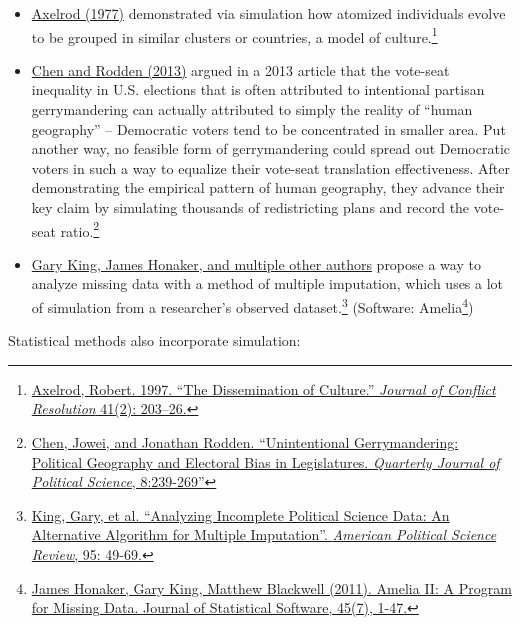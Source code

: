 \documentclass[]{book}
\providecommand{\tightlist}{%
  \setlength{\itemsep}{0pt}\setlength{\parskip}{0pt}}
\let\rmarkdownfootnote\footnote%
\def\footnote{\protect\rmarkdownfootnote}
\theoremstyle{definition}
\theoremstyle{definition}
\theoremstyle{definition}
\theoremstyle{remark}
\begin{document}
\begin{itemize}
\tightlist
\item
  \href{http://www-personal.umich.edu/~axe/research/Dissemination.pdf}{Axelrod
  (1977)} demonstrated via simulation how atomized individuals evolve to
  be grouped in similar clusters or countries, a model of
  culture.\footnote{\href{http://www-personal.umich.edu/~axe/research/Dissemination.pdf}{Axelrod,
    Robert. 1997. ``The Dissemination of Culture.'' \emph{Journal of
    Conflict Resolution} 41(2): 203--26.}}
\item
  \href{http://www-personal.umich.edu/~jowei/florida.pdf}{Chen and
  Rodden (2013)} argued in a 2013 article that the vote-seat inequality
  in U.S. elections that is often attributed to intentional partisan
  gerrymandering can actually attributed to simply the reality of
  ``human geography'' -- Democratic voters tend to be concentrated in
  smaller area. Put another way, no feasible form of gerrymandering
  could spread out Democratic voters in such a way to equalize their
  vote-seat translation effectiveness. After demonstrating the empirical
  pattern of human geography, they advance their key claim by simulating
  thousands of redistricting plans and record the vote-seat
  ratio.\footnote{\href{http://www-personal.umich.edu/~jowei/florida.pdf}{Chen,
    Jowei, and Jonathan Rodden. ``Unintentional Gerrymandering:
    Political Geography and Electoral Bias in Legislatures.
    \emph{Quarterly Journal of Political Science}, 8:239-269''}}
\item
  \href{https://gking.harvard.edu/files/abs/evil-abs.shtml}{Gary King,
  James Honaker, and multiple other authors} propose a way to analyze
  missing data with a method of multiple imputation, which uses a lot of
  simulation from a researcher's observed dataset.\footnote{\href{https://gking.harvard.edu/files/abs/evil-abs.shtml}{King,
    Gary, et al. ``Analyzing Incomplete Political Science Data: An
    Alternative Algorithm for Multiple Imputation''. \emph{American
    Political Science Review}, 95: 49-69.}} (Software: Amelia\footnote{\href{http://www.jstatsoft.org/v45/i07/}{James
    Honaker, Gary King, Matthew Blackwell (2011). Amelia II: A Program
    for Missing Data. Journal of Statistical Software, 45(7), 1-47.}})
\end{itemize}

Statistical methods also incorporate simulation:
\end{document}
